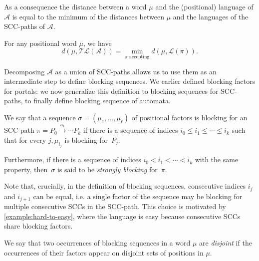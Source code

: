 \documentclass[letterpaper, USenglish, cleveref, autoref, thm-restate, numberwithinsect]{lipics-v2021}
\theoremstyle{theorem}
\theoremstyle{definition}
\newcommand{\Aa}{\mathcal{A}}
\newcommand{\lang}[1]{\mathcal{L}(#1)}
\newcommand{\SCCpath}{\pi}
\newcommand{\timedlang}[1]{\mathcal{TL}( #1 )}
\begin{document}
As a consequence the distance between a word $\mu$ and the (positional) language of $\Aa$ is equal to the minimum of the distances between $\mu$ and the languages of the SCC-paths of $\Aa$.
\begin{corollary}\label{coro:dist-to-l-path}
	For any positional word $\mu$, we have \[d(\mu, \timedlang{\Aa}) = \min_{\SCCpath \text{ accepting}} d(\mu,\lang{\SCCpath}).\]
\end{corollary}

Decomposing $\Aa$ as a union of SCC-paths allows us to use them as an intermediate step to define blocking sequences.
We earlier defined blocking factors for portals: we now generalize this definition to blocking sequences for SCC-paths, to finally define blocking sequence of automata.

\begin{definition}
	We say that a sequence $\sigma = (\mu_1, \ldots, \mu_\ell)$ of positional factors is blocking for an SCC-path 
	$\SCCpath = P_0 \xrightarrow{a_1} \cdots  P_k$ if there is a sequence of indices $i_0 \leq i_1 \leq \cdots \leq i_k$ 
	such that for every $j, \mu_{i_j}$ is blocking for~$P_j$.

	Furthermore, if there is a sequence of indices $i_0 < i_1 < \cdots < i_k$ with the same property, then~$\sigma$ is said to be \emph{strongly blocking} for~$\SCCpath$.
\end{definition}

Note that, crucially, in the definition of blocking sequences, consecutive indices $i_j$ and $i_{j+1}$ can be equal, i.e. a single factor of the sequence may be blocking for multiple consecutive SCCs in the SCC-path. This choice is motivated by \cref{example:hard-to-easy}, where the language is easy because consecutive SCCs share blocking factors.

We say that two occurrences of blocking sequences in a word $\mu$ are \emph{disjoint} if the occurrences of their factors appear on disjoint sets of positions in $\mu$.
\end{document}
